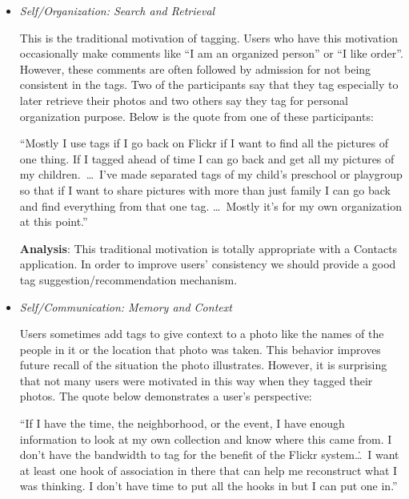 \begin{itemize}
    \item \textit{Self/Organization: Search and Retrieval}
        
        This is the traditional motivation of tagging. Users who have this motivation occasionally make comments like ``I am an organized person'' or ``I like order''. However, these comments are often followed by admission for not being consistent in the tags. Two of the participants say that they tag especially to later retrieve their photos and two others say they tag for personal organization purpose. Below is the quote from one of these participants:

      ``Mostly I use tags if I go back on Flickr if I want to find all the pictures of one thing. If I tagged ahead of time I can go back and get all my pictures of my children.\ \ldots \ I've made separated tags of my child's preschool or playgroup so that if I want to share pictures with more than just family I can go back and find everything from that one tag. \ldots \ Mostly it's for my own organization at this point.''

      \textbf{Analysis}: This traditional motivation is totally appropriate with a Contacts application. In order to improve users' consistency we should provide a good tag suggestion/recommendation mechanism.

  \item \textit{Self/Communication: Memory and Context}
      
      Users sometimes add tags to give context to a photo like the names of the people in it or the location that photo was taken. This behavior improves future recall of the situation the photo illustrates. However, it is surprising that not many users were motivated in this way when they tagged their photos. The quote below demonstrates a user's perspective:
      
      ``If I have the time, the neighborhood, or the event, I have enough information to look at my own collection and know where this came from. I don't have the bandwidth to tag for the benefit of the Flickr system\. \ldots \ I want at least one hook of association in there that can help me reconstruct what I was thinking. I don't have time to put all the hooks in but I can put one in.''


\end{itemize}
